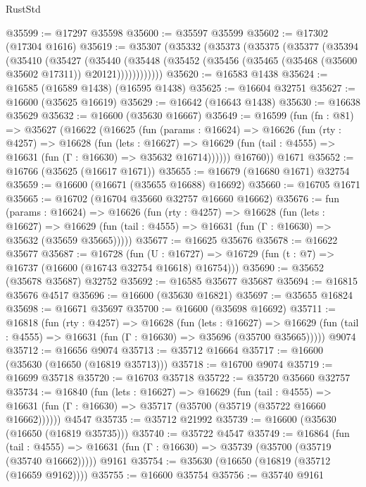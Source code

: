 \begin{lexlean}{RustStd}
\begin{coremodule}
{\begin{coremodule}
{{{{{{{{{{{{{{{{{{{{{{{{{{{{{{{{{{{{{{{{{{{{{{{{{{{{{{{@35599 := @17297 @35598
@35600 := @35597 @35599
@35602 := @17302 (@17304 @1616)
@35619 := @35307
    (@35332
      (@35373
        (@35375
          (@35377
            (@35394
              (@35410
                (@35427
                  (@35440
                    (@35448
                      (@35452 (@35456 (@35465 (@35468 (@35600 @35602 @17311)) @20121))))))))))))
@35620 := @16583 @1438
@35624 := @16585 (@16589 @1438) (@16595 @1438)
@35625 := @16604 @32751
@35627 := @16600 (@35625 @16619)
@35629 := @16642 (@16643 @1438)
@35630 := @16638 @35629
@35632 := @16600 (@35630 @16667)
@35649 := @16599
    (fun (fn : @81) =>
    @35627
      (@16622
        (@16625
          (fun (params : @16624) =>
          @16626
            (fun (rty : @4257) =>
            @16628
              (fun (lets : @16627) =>
              @16629 (fun (tail : @4555) => @16631 (fun (Γ : @16630) => @35632 @16714))))))
        @16760))
    @1671
@35652 := @16766 (@35625 (@16617 @1671))
@35655 := @16679 (@16680 @1671) @32754
@35659 := @16600 (@16671 (@35655 @16688) @16692)
@35660 := @16705 @1671
@35665 := @16702 (@16704 @35660 @32757 @16660 @16662)
@35676 := fun (params : @16624) =>
  @16626
    (fun (rty : @4257) =>
    @16628
      (fun (lets : @16627) =>
      @16629 (fun (tail : @4555) => @16631 (fun (Γ : @16630) => @35632 (@35659 @35665)))))
@35677 := @16625 @35676
@35678 := @16622 @35677
@35687 := @16728
    (fun (U : @16727) => @16729 (fun (t : @7) => @16737 (@16600 (@16743 @32754 @16618) @16754)))
@35690 := @35652 (@35678 @35687) @32752
@35692 := @16585 @35677 @35687
@35694 := @16815 @35676 @4517
@35696 := @16600 (@35630 @16821)
@35697 := @35655 @16824
@35698 := @16671 @35697
@35700 := @16600 (@35698 @16692)
@35711 := @16818
    (fun (rty : @4257) =>
    @16628
      (fun (lets : @16627) =>
      @16629 (fun (tail : @4555) => @16631 (fun (Γ : @16630) => @35696 (@35700 @35665)))))
    @9074
@35712 := @16656 @9074
@35713 := @35712 @16664
@35717 := @16600 (@35630 (@16650 (@16819 @35713)))
@35718 := @16700 @9074
@35719 := @16699 @35718
@35720 := @16703 @35718
@35722 := @35720 @35660 @32757
@35734 := @16840
    (fun (lets : @16627) =>
    @16629
      (fun (tail : @4555) =>
      @16631 (fun (Γ : @16630) => @35717 (@35700 (@35719 (@35722 @16660 @16662))))))
    @4547
@35735 := @35712 @21992
@35739 := @16600 (@35630 (@16650 (@16819 @35735)))
@35740 := @35722 @4547
@35749 := @16864
    (fun (tail : @4555) => @16631 (fun (Γ : @16630) => @35739 (@35700 (@35719 (@35740 @16662)))))
    @9161
@35754 := @35630 (@16650 (@16819 (@35712 (@16659 @9162))))
@35755 := @16600 @35754
@35756 := @35740 @9161
}}}}}}}}}}}}}}}}}}}}}}}}}}}}}}}}}}}}}}}}}}}}}}}}}}}}}}}
\end{coremodule}}
\end{coremodule}
\end{lexlean}
